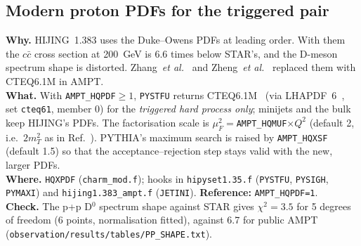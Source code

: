 \documentclass[11pt,a4paper]{article}
\newcommand{\sw}[1]{\texttt{#1}}
\newcommand{\code}[1]{\texttt{#1}}
\begin{document}
\subsection{Modern proton PDFs for the triggered pair}
\textbf{Why.} HIJING~1.383 uses the Duke--Owens PDFs at leading order. With them the $c\bar c$ cross section at
200~GeV is 6.6 times below STAR's, and the D-meson spectrum shape is distorted. Zhang~\emph{et al.}~\cite{zhang2019}
and Zheng~\emph{et al.}~\cite{zheng2020} replaced them with CTEQ6.1M in AMPT.\\
\textbf{What.} With \sw{AMPT\_HQPDF}$\geq1$, \code{PYSTFU} returns CTEQ6.1M~\cite{cteq61} (via LHAPDF~6~\cite{lhapdf},
set \code{cteq61}, member 0) for the \emph{triggered hard process only}; minijets and the bulk keep HIJING's PDFs.
The factorisation scale is $\mu_F^2=$\sw{AMPT\_HQMUF}$\times Q^2$ (default 2, i.e.\ $2m_T^2$ as in
Ref.~\cite{zheng2020}). PYTHIA's maximum search is raised by \sw{AMPT\_HQXSF} (default 1.5) so that the
acceptance--rejection step stays valid with the new, larger PDFs.\\
\textbf{Where.} \code{HQXPDF} (\code{charm\_mod.f}); hooks in \code{hipyset1.35.f} (\code{PYSTFU}, \code{PYSIGH},
\code{PYMAXI}) and \code{hijing1.383\_ampt.f} (\code{JETINI}). \textbf{Reference:} \sw{AMPT\_HQPDF=1}.\\
\textbf{Check.} The p+p D$^0$ spectrum shape against STAR gives $\chi^2=3.5$ for 5 degrees of freedom (6 points, normalisation fitted), against 6.7 for public
AMPT (\code{observation/results/tables/PP\_SHAPE.txt}).
\end{document}
